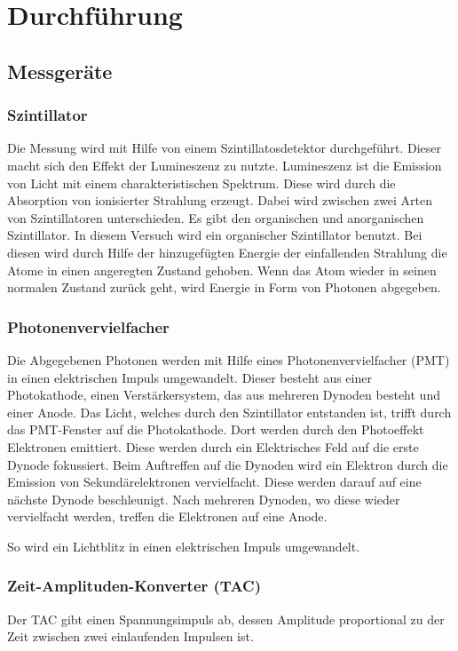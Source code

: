 \section{Durchführung}
\label{sec:Durchführung}
\subsection{Messgeräte}
\subsubsection{Szintillator}
Die Messung wird mit Hilfe von einem Szintillatosdetektor durchgeführt. Dieser macht sich den Effekt der Lumineszenz zu nutzte. 
Lumineszenz ist die Emission von Licht mit einem charakteristischen Spektrum. Diese wird durch die Absorption von ionisierter Strahlung erzeugt. 
Dabei wird zwischen zwei Arten von Szintillatoren unterschieden. Es gibt den organischen und anorganischen Szintillator.
In diesem Versuch wird ein organischer Szintillator benutzt.  
Bei diesen wird durch Hilfe der hinzugefügten Energie der einfallenden Strahlung die Atome in einen angeregten Zustand gehoben. 
Wenn das Atom wieder in seinen normalen Zustand zurück geht, wird Energie in Form von Photonen abgegeben.

\subsubsection{Photonenvervielfacher}
Die Abgegebenen Photonen werden mit Hilfe eines Photonenvervielfacher (PMT) in einen elektrischen Impuls umgewandelt. 
Dieser besteht aus einer Photokathode, einen Verstärkersystem, das aus mehreren Dynoden besteht und einer Anode. 
Das Licht, welches durch den Szintillator entstanden ist, trifft durch das PMT-Fenster auf die Photokathode. 
Dort werden durch den Photoeffekt Elektronen emittiert. Diese werden durch ein Elektrisches Feld auf die erste Dynode fokussiert. 
Beim Auftreffen auf die Dynoden wird ein Elektron durch die Emission von Sekundärelektronen vervielfacht. Diese werden darauf auf eine nächste Dynode beschleunigt. 
Nach mehreren Dynoden, wo diese wieder vervielfacht werden, treffen die Elektronen auf eine Anode.

\noindent So wird ein Lichtblitz in einen elektrischen Impuls umgewandelt. 

\subsubsection{Zeit-Amplituden-Konverter (TAC)}
Der TAC gibt einen Spannungsimpuls ab, dessen Amplitude proportional zu der Zeit zwischen zwei einlaufenden Impulsen ist. 


